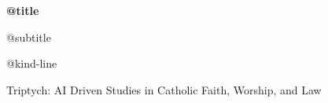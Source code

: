 \vspace*{0.12\textheight}
{\Huge\bfseries @{title}\par}
\vspace{0.9em}
{\Large @{subtitle}\par}
\vspace{1.6em}
{\large @{kind-line}\par}
\vfill
{\small Triptych: AI Driven Studies in Catholic Faith, Worship, and Law\par}
